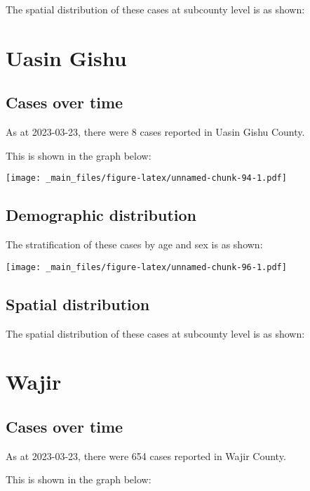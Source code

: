 \documentclass[
]{book}
\begin{document}
The spatial distribution of these cases at subcounty level is as shown:

\hypertarget{uasin-gishu}{%
\chapter{Uasin Gishu}\label{uasin-gishu}}

\hypertarget{cases-over-time-15}{%
\section{Cases over time}\label{cases-over-time-15}}

As at 2023-03-23, there were 8 cases reported in Uasin Gishu County.

This is shown in the graph below:

\texttt{[image: \_main\_files/figure-latex/unnamed-chunk-94-1.pdf]}

\hypertarget{demographic-distribution-15}{%
\section{Demographic distribution}\label{demographic-distribution-15}}

The stratification of these cases by age and sex is as shown:

\texttt{[image: \_main\_files/figure-latex/unnamed-chunk-96-1.pdf]}

\hypertarget{spatial-distribution-15}{%
\section{Spatial distribution}\label{spatial-distribution-15}}

The spatial distribution of these cases at subcounty level is as shown:

\hypertarget{wajir}{%
\chapter{Wajir}\label{wajir}}

\hypertarget{cases-over-time-16}{%
\section{Cases over time}\label{cases-over-time-16}}

As at 2023-03-23, there were 654 cases reported in Wajir County.

This is shown in the graph below:
\end{document}
